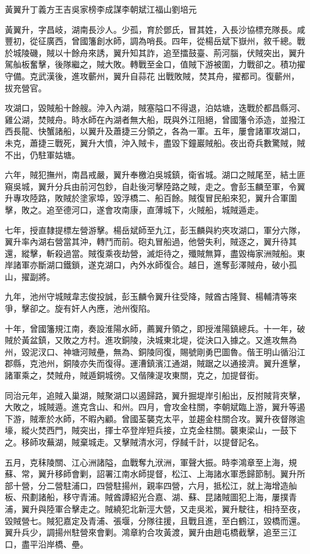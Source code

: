 
\begin{pinyinscope}
黃翼升丁義方王吉吳家榜李成謀李朝斌江福山劉培元

黃翼升，字昌岐，湖南長沙人。少孤，育於鄧氏，冒其姓，入長沙協標充隊長。咸豐初，從征廣西，曾國籓創水師，調為哨長。四年，從楊岳斌下嶽州，敘千總。戰於城陵磯，賊以十餘舟來誘，翼升知其詐，追至擂鼓臺、荊河腦，伏賊突出，翼升駕舢板奮擊，後隊繼之，賊大敗。轉戰至金口，值賊下游被圍，力戰卻之。積功擢守備。克武漢後，進攻蘄州，翼升自蒜花出戰敗賊，焚其舟，擢都司。復蘄州，拔充營官。

攻湖口，毀賊船十餘艘。沖入內湖，賊塞隘口不得退，泊姑塘，迭戰於都昌縣河、雞公湖，焚賊舟。時水師在內湖者無大船，既與外江阻絕，曾國籓令添造，並撥江西長龍、快蟹諸船，以翼升及蕭捷三分領之，各為一軍。五年，屢會諸軍攻湖口，未克，蕭捷三戰死，翼升大憤，沖入賊卡，盡毀下鐘巖賊船。夜出奇兵數驚賊，賊不出，仍駐軍姑塘。

六年，賊犯撫州，南昌戒嚴，翼升奉檄泊吳城鎮，衛省城。湖口之賊尾至，結土匪窺吳城，翼升分兵由前河包鈔，自赴後河擊陸路之賊，走之。會彭玉麟至軍，令翼升專攻陸路，敗賊於塗家埠，毀浮橋二、船百餘。賊復冒民船來犯，翼升合軍圍擊，敗之。追至德河口，遂會攻南康，直薄城下，火賊船，城賊遁走。

七年，授直隸提標左營游擊。楊岳斌師至九江，彭玉麟與約夾攻湖口，軍分六隊，翼升率內湖右營當其沖，轉鬥而前。砲丸冒船過，他營失利，賊逐之，翼升待其還，縱擊，斬殺過當。賊復乘夜劫營，滅炬待之，殲賊無算，盡毀梅家洲賊船。東岸諸軍亦斷湖口鐵鎖，遂克湖口，內外水師復合。越日，進奪彭澤賊舟，破小孤山，擢副將。

九年，池州守城賊韋志俊投誠，彭玉麟令翼升往受降，賊酋古隆賢、楊輔清等來爭，擊卻之。旋有奸人內應，池州復陷。

十年，曾國籓規江南，奏設淮陽水師，薦翼升領之，即授淮陽鎮總兵。十一年，破賊於黃盆鎮，又敗之方村。進攻銅陵，決城東北堤，從決口入據之。又進攻無為州，毀泥汊口、神塘河賊壘，無為、銅陵同復，賜號剛勇巴圖魯。偕王明山循沿江郡縣，克池州，銅陵亦失而復得。運漕鎮濱江通湖，賊踞之以通接濟。翼升進擊，諸軍乘之，焚賊舟，賊遁銅城徬。又偕陳湜攻東關，克之，加提督銜。

同治元年，追賊入巢湖，賊聚湖口以遏歸路，翼升掘堤岸引船出，反拊賊背夾擊，大敗之，城賊遁。進克含山、和州。四月，會攻金柱關，李朝斌臨上游，翼升等遏下游，賊牽於水師，不暇內顧。曾國荃襲克太平，並趨金柱關合攻。翼升夜督隊逾壕，縱火焚西門，賊突出，揮士卒登岸短兵接，立克金柱關。襲東梁山，一鼓下之。移師攻蕪湖，賊棄城走。又擊賊清水河，俘馘千計，以提督記名。

五月，克秣陵關、江心洲諸隘，血戰奪九洑洲，軍聲大振。時李鴻章至上海，規蘇、常，翼升移師會剿，詔署江南水師提督，松江、上海諸水軍悉歸節制。翼升所部十營，分二營駐浦口，四營駐揚州，親率四營，六月，抵松江，就上海增造舢板、飛劃諸船，移守青浦。賊酋譚紹光合嘉、湖、蘇、昆諸賊圖犯上海，屢撲青浦，翼升與陸軍合擊走之。賊繞犯北新涇大營，又走吳淞，翼升駛往，相持至夜，毀賊營七。賊犯嘉定及青浦、張堰，分隊往援，且戰且進，至白鶴江，毀橋而還。翼升兵少，調揚州駐營來會剿。鴻章約合攻黃渡，翼升由趙屯橋截擊，追至三江口，盡平沿岸橋、壘。


\end{pinyinscope}
